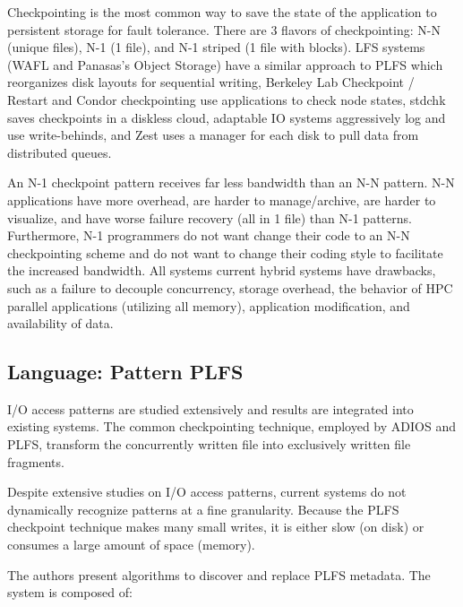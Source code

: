 Checkpointing is the most common way to save the state of the application to
persistent storage for fault tolerance. There are 3 flavors of checkpointing:
N-N (unique files), N-1 (1 file), and N-1 striped (1 file with blocks). LFS
systems (WAFL and Panasas's Object Storage) have a similar approach to PLFS
which reorganizes disk layouts for sequential writing, Berkeley Lab Checkpoint
/ Restart and Condor checkpointing use applications to check node states,
stdchk saves checkpoints in a  diskless cloud, adaptable IO systems
aggressively log and use write-behinds, and Zest uses a manager for each disk
to pull data from distributed queues.

An N-1 checkpoint pattern receives far less bandwidth than an N-N pattern. N-N
applications have more overhead, are harder to manage/archive, are harder to
visualize, and have worse failure recovery (all in 1 file) than N-1 patterns.
Furthermore, N-1 programmers do not want change their code to an N-N
checkpointing scheme and do not want to change their coding style to facilitate
the increased bandwidth. All systems current hybrid systems have drawbacks,
such as a failure to decouple concurrency, storage overhead, the behavior of
HPC parallel applications (utilizing all memory), application modification, and
availability of data.

\subsection{Language: Pattern PLFS}
\label{sec:language-patterned-io}

I/O access patterns are studied extensively and results are integrated into
existing systems. The common checkpointing technique, employed by ADIOS and
PLFS, transform the concurrently written file into exclusively written file
fragments. 

Despite extensive studies on I/O access patterns, current systems do not
dynamically recognize patterns at a fine granularity. Because the PLFS
checkpoint technique makes many small writes, it is either slow (on disk) or
consumes a large amount of space (memory).  

The authors present algorithms to discover and replace PLFS metadata. The
system is composed of: 

